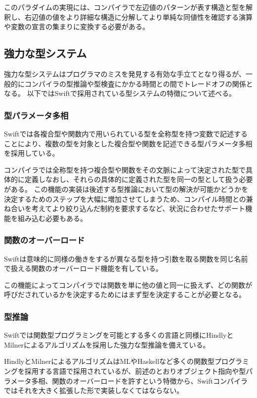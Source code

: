 このパラダイムの実現には、コンパイラで左辺値のパターンが表す構造と型を解釈し、右辺値の値をより詳細な構造に分解してより単純な同値性を確認する演算や変数の宣言の集まりに変換する必要がある。


\subsection{強力な型システム}

強力な型システムはプログラマのミスを発見する有効な手立てとなり得るが、一般的にコンパイラの型推論や型検査にかかる時間との間でトレードオフの関係となる。
以下ではSwiftで採用されている型システムの特徴について述べる。

\subsubsection{型パラメータ多相}

Swiftでは各複合型や関数内で用いられている型を全称型を持つ変数で記述することにより、複数の型を対象とした複合型や関数を記述できる型パラメータ多相を採用している。

コンパイラでは全称型を持つ複合型や関数をその文脈によって決定された型で具体的に定義しなおし、それらの具体的に定義された型を同一の型として扱う必要がある。
この機能の実装は後述する型推論において型の解決が可能かどうかを決定するためのステップを大幅に増加させてしまうため、コンパイル時間との兼ね合いを考えてより絞り込んだ制約を要求するなど、状況に合わせたサポート機能を組み込む必要もある。

\subsubsection{関数のオーバーロード}

Swiftは意味的に同様の働きをするが異なる型を持つ引数を取る関数を同じ名前で扱える関数のオーバーロード機能を有している。

この機能によってコンパイラでは関数を単に他の値と同一に扱えず、どの関数が呼びだされているかを決定するためにはまず型を決定することが必要となる。

\subsubsection{型推論}

Swiftでは関数型プログラミングを可能とする多くの言語と同様にHindlyとMilnerによるアルゴリズムを採用した強力な型推論を備えている。

HindlyとMilnerによるアルゴリズムはMLやHaskellなど多くの関数型プログラミングを採用する言語で採用されているが、前述のとおりオブジェクト指向や型パラメータ多相、関数のオーバーロードを許すという特徴から、Swiftコンパイラではそれを大きく拡張した形で実装しなくてはならない。


